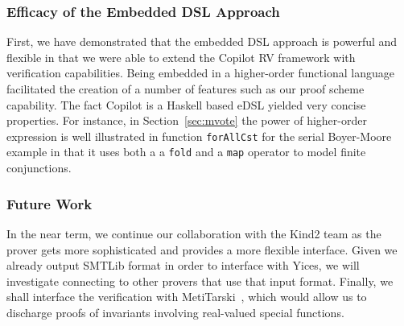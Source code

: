\subsubsection{Efficacy of the Embedded DSL Approach} First, we have
demonstrated that the embedded DSL approach is powerful and flexible
in that we were able to extend the Copilot RV framework with
verification capabilities. Being embedded in a  higher-order functional language
facilitated the creation of  a number of features such as our proof
scheme capability. The fact Copilot is a Haskell based eDSL yielded
very  concise properties. For instance, in Section~\ref{sec:mvote}
the power of higher-order expression is well illustrated in 
function  \texttt{forAllCst} for the
serial Boyer-Moore example in that it  uses both a  a \texttt{fold}
and a \texttt{map} operator to model finite conjunctions. 


\subsubsection{Future Work} In the near term, we continue our
collaboration with the Kind2 team as the prover gets more
sophisticated and provides a more flexible interface. Given we already
output SMTLib format in order to interface with Yices, we will
investigate connecting to other provers that use that input
format. Finally, we shall interface the verification with
MetiTarski~\cite{AkbarpourPaulson}, which would allow us to discharge
proofs of invariants involving real-valued special functions.

